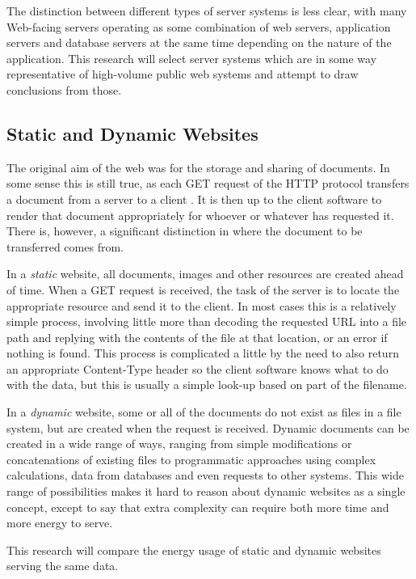 The distinction between different types of server systems is less clear, with many Web-facing servers operating as some combination of web servers, application servers and database servers at the same time depending on the nature of the application. This research will select server systems which are in some way representative of high-volume public web systems and attempt to draw conclusions from those.

\subsection{Static and Dynamic Websites}

The original aim of the web was for the storage and sharing of documents. In some sense this is still true, as each GET request of the HTTP protocol transfers a document from a server to a client . It is then up to the client software to render that document appropriately for whoever or whatever has requested it. There is, however, a significant distinction in where the document to be transferred comes from.

In a \emph{static} website, all documents, images and other resources are created ahead of time. When a GET request is received, the task of the server is to locate the appropriate resource and send it to the client. In most cases this is a relatively simple process, involving little more than decoding the requested URL into a file path and replying with the contents of the file at that location, or an error if nothing is found. This process is complicated a little by the need to also return an appropriate Content-Type header so the client software knows what to do with the data, but this is usually a simple look-up based on part of the filename.

In a \emph{dynamic} website, some or all of the documents do not exist as files in a file system, but are created when the request is received. Dynamic documents can be created in a wide range of ways, ranging from simple modifications or concatenations of existing files to programmatic approaches using complex calculations, data from databases and even requests to other systems. This wide range of possibilities makes it hard to reason about dynamic websites as a single concept, except to say that extra complexity can require both more time and more energy to serve.

This research will compare the energy usage of static and dynamic websites serving the same data.

